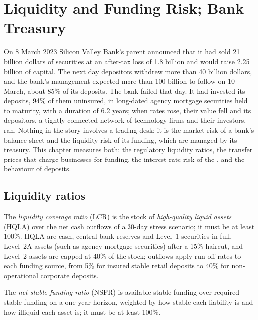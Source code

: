 \chapter{Liquidity and Funding Risk; Bank Treasury}\label{ch:rc:liquidity-and-funding-risk-bank-treasury}

On 8 March 2023 Silicon Valley Bank's parent announced that it had sold 21 billion dollars of
securities at an after-tax loss of 1.8 billion and would raise 2.25 billion of capital. The next
day depositors withdrew more than 40 billion dollars, and the bank's management expected more
than 100 billion to follow on 10 March, about 85\% of its deposits. The bank failed that day.
It had invested its deposits, 94\% of them uninsured, in long-dated agency mortgage securities
held to maturity, with a duration of 6.2 years; when rates rose, their value fell and its
depositors, a tightly connected network of technology firms and their investors, ran. Nothing in
the story involves a trading desk: it is the market risk of a bank's balance sheet and the
liquidity risk of its funding, which are managed by its treasury. This chapter measures both: the
regulatory liquidity ratios, the transfer prices that charge businesses for funding, the
interest rate risk of the , and the behaviour of deposits.

\section{Liquidity ratios}

\begin{definition}\label{def:rc:liquidity-and-funding-risk-bank-treasury:lcr}
The \emph{liquidity coverage ratio} (LCR) is the stock of
\emph{high-quality liquid assets} (HQLA) over the net cash outflows
of a 30-day stress scenario; it must be at least 100\%. HQLA are cash, central bank reserves and
Level~1 securities in full, Level~2A assets (such as agency mortgage securities) after a 15\% haircut,
and Level~2 assets are capped at 40\% of the stock; outflows apply run-off rates to each funding source,
from 5\% for insured stable retail deposits to 40\% for non-operational corporate deposits.
\end{definition}

\begin{definition}\label{def:rc:liquidity-and-funding-risk-bank-treasury:nsfr}
The \emph{net stable funding ratio} (NSFR) is available stable
funding over required stable funding on a one-year horizon, weighted by how stable each liability is
and how illiquid each asset is; it must be at least 100\%.
\end{definition}

